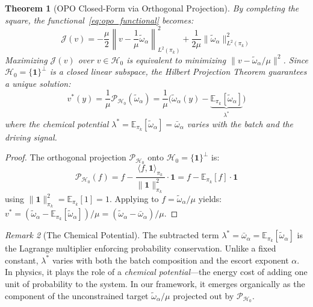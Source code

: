 \documentclass[11pt]{article}
\newtheorem{theorem}{Theorem}[section]
\theoremstyle{definition}
\theoremstyle{remark}
\newtheorem{remark}[theorem]{Remark}
\newcommand{\E}{\mathbb{E}}
\newcommand{\pik}{\pi_k}
\begin{document}
\begin{theorem}[OPO Closed-Form via Orthogonal Projection]
\label{thm:closed_form_opo}
By completing the square, the functional~\eqref{eq:opo_functional} becomes:
\begin{equation}
\mathcal{J}(v) = -\frac{\mu}{2}\left\|v - \frac{1}{\mu}\tilde{\omega}_\alpha\right\|^2_{L^2(\pik)} + \frac{1}{2\mu}\|\tilde{\omega}_\alpha\|^2_{L^2(\pik)}
\end{equation}
Maximizing $\mathcal{J}(v)$ over $v \in \mathcal{H}_0$ is equivalent to minimizing $\|v - \tilde{\omega}_\alpha/\mu\|^2$.
Since $\mathcal{H}_0 = \{\mathbf{1}\}^\perp$ is a closed linear subspace, the Hilbert Projection Theorem guarantees a unique solution:
\begin{equation}
\label{eq:v_star}
\boxed{
v^*(y) = \frac{1}{\mu}\mathcal{P}_{\mathcal{H}_0}(\tilde{\omega}_\alpha) = \frac{1}{\mu}\Big(\tilde{\omega}_\alpha(y) - \underbrace{\E_{\pik}[\tilde{\omega}_\alpha]}_{\lambda^*}\Big)
}
\end{equation}
where the chemical potential $\lambda^* = \E_{\pik}[\tilde{\omega}_\alpha] = \bar{\omega}_\alpha$ varies with the batch and the driving signal.
\end{theorem}

\begin{proof}
The orthogonal projection $\mathcal{P}_{\mathcal{H}_0}$ onto $\mathcal{H}_0 = \{\mathbf{1}\}^\perp$ is:
\begin{equation}
\mathcal{P}_{\mathcal{H}_0}(f) = f - \frac{\langle f, \mathbf{1}\rangle_{\pik}}{\|\mathbf{1}\|^2_{\pik}}\cdot\mathbf{1} = f - \E_{\pik}[f]\cdot\mathbf{1}
\end{equation}
using $\|\mathbf{1}\|^2_{\pik} = \E_{\pik}[1] = 1$. Applying to $f = \tilde{\omega}_\alpha/\mu$ yields:
$v^* = (\tilde{\omega}_\alpha - \E_{\pik}[\tilde{\omega}_\alpha])/\mu = (\tilde{\omega}_\alpha - \bar{\omega}_\alpha)/\mu$.
\end{proof}

\begin{remark}[The Chemical Potential]
\label{rem:chemical_potential}
The subtracted term $\lambda^* = \bar{\omega}_\alpha = \E_{\pik}[\tilde{\omega}_\alpha]$ is the Lagrange multiplier enforcing probability conservation. Unlike a fixed constant, $\lambda^*$ varies with both the batch composition and the escort exponent $\alpha$. In physics, it plays the role of a \emph{chemical potential}---the energy cost of adding one unit of probability to the system. In our framework, it emerges organically as the component of the unconstrained target $\tilde{\omega}_\alpha/\mu$ projected out by $\mathcal{P}_{\mathcal{H}_0}$.
\end{remark}
\end{document}
